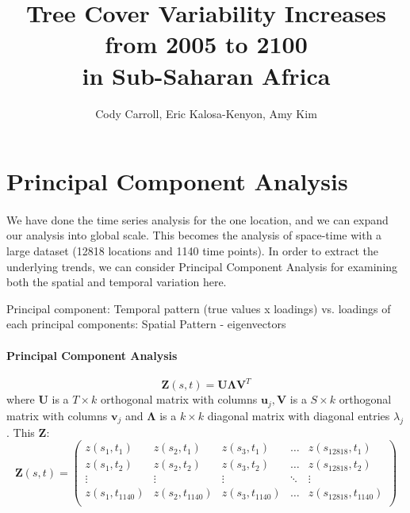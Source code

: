 \documentclass[11pt]{article}
\title{Tree Cover Variability Increases from 2005 to 2100\\ in Sub-Saharan Africa}
\author{ Cody Carroll, Eric Kalosa-Kenyon, Amy Kim}
\begin{document}
\maketitle

\begin{abstract}

\end{abstract}

\section{Principal Component Analysis}
\paragraph{} 
We have done the time series analysis for the one location, and we can expand our analysis into global scale. This becomes the analysis of space-time with a large dataset (12818 locations and 1140 time points). In order to extract the underlying trends, we can consider Principal Component Analysis for examining both the spatial and temporal variation here. 

Principal component: Temporal pattern (true values x loadings) vs. loadings of each principal components: Spatial Pattern - eigenvectors
\paragraph{Principal Component Analysis}
\begin{equation}
\mathbf{Z}(s,t) = \mathbf{U}\mathbf{\Lambda}\mathbf{V}^T
\end{equation}
where $\mathbf{U}$ is a $T \times k$ orthogonal matrix with columns $\mathbf{u}_j, \mathbf{V}$ is a $S \times k$ orthogonal matrix with columns $\mathbf{v}_j$ and $\mathbf{\Lambda}$ is a $k \times k$ diagonal matrix with diagonal entries $\lambda_j$. This $\mathbf{Z}$: 
\begin{equation}
\mathbf{Z}(s,t)  = \begin{pmatrix}
z(s_1, t_1) & z(s_2, t_1) & z(s_3, t_1) & \dots & z(s_{12818}, t_1) \\
z(s_1, t_2) & z(s_2, t_2) & z(s_3, t_2) & \dots & z(s_{12818}, t_2) \\
\vdots & \vdots & \vdots & \ddots & \vdots\\
z(s_1, t_{1140}) & z(s_2, t_{1140}) & z(s_3, t_{1140}) & \dots & z(s_{12818}, t_{1140})\\ 
\end{pmatrix}
\end{equation}
\end{document}

